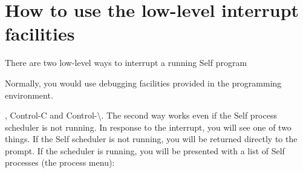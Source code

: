 \documentclass[letterpaper,10pt,english]{sphinxmanual}
\begin{document}
\section{How to use the low-level interrupt facilities}
\label{\detokenize{lowlevel::doc}}\label{\detokenize{lowlevel:how-to-use-the-low-level-interrupt-facilities}}
There are two low-level ways to interrupt a running Self program %
\begin{footnote}[1]\sphinxAtStartFootnote
Normally, you would use debugging facilities provided in the programming environment.
%
\end{footnote} , Control-C and Control-\textbackslash{}. The
second way works even if the Self process scheduler is not running.
In response to the interrupt, you will see one of two things. If the Self scheduler is not running,
you will be returned directly to the  prompt. If the scheduler is running, you will be presented
with a list of Self processes (the process menu):
\end{document}

